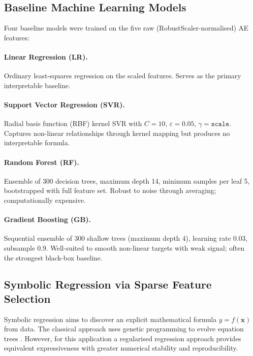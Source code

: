 \documentclass[12pt,a4paper]{article}
\begin{document}
\subsection{Baseline Machine Learning Models}
\label{subsec:baseline}

Four baseline models were trained on the five raw (RobustScaler-normalised) AE
features:

\paragraph{Linear Regression (LR).}
Ordinary least-squares regression on the scaled features. Serves as the primary
interpretable baseline.

\paragraph{Support Vector Regression (SVR).}
Radial basis function (RBF) kernel SVR with $C = 10$, $\varepsilon = 0.05$,
$\gamma = \texttt{scale}$. Captures non-linear relationships through kernel
mapping but produces no interpretable formula.

\paragraph{Random Forest (RF).}
Ensemble of 300 decision trees, maximum depth 14, minimum samples per leaf 5,
bootstrapped with full feature set. Robust to noise through averaging;
computationally expensive.

\paragraph{Gradient Boosting (GB).}
Sequential ensemble of 300 shallow trees (maximum depth 4), learning rate 0.03,
subsample 0.9. Well-suited to smooth non-linear targets with weak signal; often
the strongest black-box baseline.

\subsection{Symbolic Regression via Sparse Feature Selection}
\label{subsec:sr}

Symbolic regression aims to discover an explicit mathematical formula
$y = f(\mathbf{x})$ from data. The classical approach uses genetic programming to
evolve equation trees \citep{koza1992, lacava2021}. However, for this application
a regularised regression approach provides equivalent expressiveness with greater
numerical stability and reproducibility.
\end{document}
